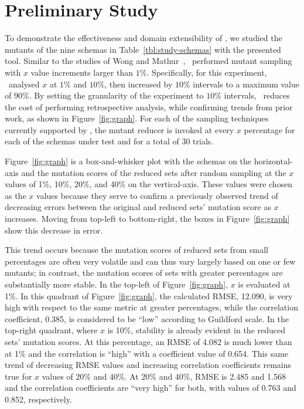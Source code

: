 \vspace*{-.25em}

\section{Preliminary Study}


To demonstrate the effectiveness and domain extensibility of \mrstudyr, we studied the mutants of the nine schemas in
Table~\ref{tbl:study-schemas} with the presented tool. Similar to the studies of Wong and
Mathur~\cite{mathur1994empirical}, \mr~performed mutant sampling with $x$ value increments larger than $1\%$.
Specifically, for this experiment, \mr~analysed $x$ at $1\%$ and $10\%$, then increased by $10\%$ intervals to a maximum
value of $90\%$. By setting the granularity of the experiment to $10\%$ intervals, \mr~reduces the cost of performing
retrospective analysis, while confirming trends from prior work, as shown in Figure~\ref{fig:graph}. For each of the
sampling techniques currently supported by \mr, the mutant reducer is invoked at every $x$ percentage for each of the
schemas under test and for a total of 30 trials.


Figure~\ref{fig:graph} is a box-and-whisker plot with the schemas on the horizontal-axis and the mutation scores of the reduced
sets after random sampling at the $x$ values of 1\%, 10\%, 20\%, and 40\% on the vertical-axis.  These values were chosen as the
$x$ values because they serve to confirm a previously observed trend of decreasing errors between the original and reduced sets'
mutation score as $x$ increases. Moving from top-left to bottom-right, the boxes in Figure~\ref{fig:graph} show this decrease in
error.



This trend occurs because the mutation scores of reduced sets from small percentages are often very volatile and can
thus vary largely based on one or few mutants; in contrast, the mutation scores of sets with greater percentages are
substantially more stable. In the top-left of Figure~\ref{fig:graph}, $x$ is evaluated at 1\%. In this quadrant of
Figure~\ref{fig:graph}, the calculated RMSE, 12.090, is very high with respect to the same metric at greater
percentages, while the correlation coefficient, 0.385, is considered to be ``low'' according to Guildford scale. In
the top-right quadrant, where $x$ is 10\%, stability is already evident in the reduced sets' mutation scores. At this
percentage, an RMSE of 4.082 is much lower than at 1\% and the correlation is ``high'' with a coefficient value of 0.654.
This same trend of decreasing RMSE values and increasing correlation coefficients remains true for $x$ values of 20\%
and 40\%. At 20\% and 40\%, RMSE is 2.485 and 1.568 and the correlation coefficients are ``very high'' for both,
with values of 0.763 and 0.852, respectively.


